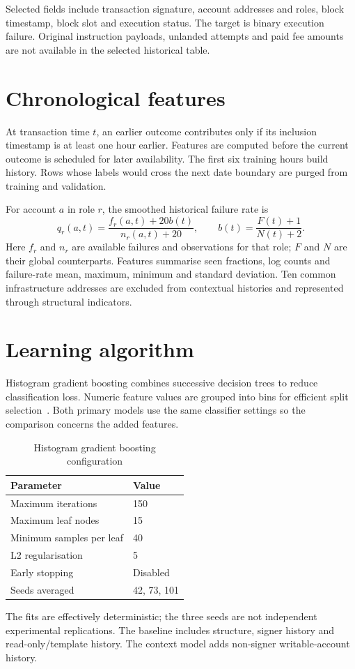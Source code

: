 \documentclass[12pt,a4paper,oneside]{report}
\begin{document}
Selected fields include transaction signature, account addresses and roles, block timestamp, block slot and execution status. The target is binary execution failure. Original instruction payloads, unlanded attempts and paid fee amounts are not available in the selected historical table.
\section{Chronological features}
At transaction time $t$, an earlier outcome contributes only if its inclusion timestamp is at least one hour earlier. Features are computed before the current outcome is scheduled for later availability. The first six training hours build history. Rows whose labels would cross the next date boundary are purged from training and validation.

For account $a$ in role $r$, the smoothed historical failure rate is
\begin{equation}q_r(a,t)=\frac{f_r(a,t)+20b(t)}{n_r(a,t)+20},\qquad b(t)=\frac{F(t)+1}{N(t)+2}.\end{equation}
Here $f_r$ and $n_r$ are available failures and observations for that role; $F$ and $N$ are their global counterparts. Features summarise seen fractions, log counts and failure-rate mean, maximum, minimum and standard deviation. Ten common infrastructure addresses are excluded from contextual histories and represented through structural indicators.
\section{Learning algorithm}
Histogram gradient boosting combines successive decision trees to reduce classification loss. Numeric feature values are grouped into bins for efficient split selection~\cite{hgb}. Both primary models use the same classifier settings so the comparison concerns the added features.
\begin{table}[ht]\centering\caption{Histogram gradient boosting configuration}
\begin{tabular}{ll}\toprule Parameter&Value\\\midrule Maximum iterations&150\\Maximum leaf nodes&15\\Minimum samples per leaf&40\\L2 regularisation&5\\Early stopping&Disabled\\Seeds averaged&42, 73, 101\\\bottomrule\end{tabular}\end{table}
The fits are effectively deterministic; the three seeds are not independent experimental replications. The baseline includes structure, signer history and read-only/template history. The context model adds non-signer writable-account history.
\end{document}
